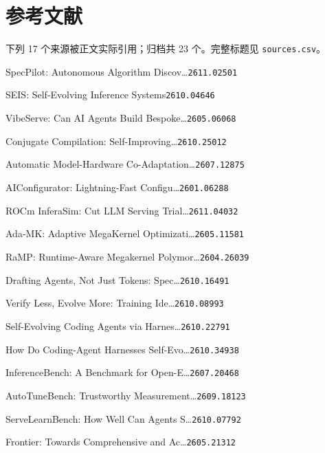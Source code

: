 \section*{参考文献}
\begingroup
\scriptsize
\setlength{\parindent}{0pt}
\setlength{\parskip}{1.4pt}
\begin{refs}
\noindent 下列 17 个来源被正文实际引用；归档共 23 个。完整标题见 \texttt{sources.csv}。\par
[1] SpecPilot: Autonomous Algorithm Discov\ldots{}\hfill{\texttt{2611.02501}}\par
[2] SEIS: Self-Evolving Inference Systems\hfill{\texttt{2610.04646}}\par
[3] VibeServe: Can AI Agents Build Bespoke\ldots{}\hfill{\texttt{2605.06068}}\par
[4] Conjugate Compilation: Self-Improving\ldots{}\hfill{\texttt{2610.25012}}\par
[5] Automatic Model-Hardware Co-Adaptation\ldots{}\hfill{\texttt{2607.12875}}\par
[6] AIConfigurator: Lightning-Fast Configu\ldots{}\hfill{\texttt{2601.06288}}\par
[7] ROCm InferaSim: Cut LLM Serving Trial\ldots{}\hfill{\texttt{2611.04032}}\par
[8] Ada-MK: Adaptive MegaKernel Optimizati\ldots{}\hfill{\texttt{2605.11581}}\par
[9] RaMP: Runtime-Aware Megakernel Polymor\ldots{}\hfill{\texttt{2604.26039}}\par
[10] Drafting Agents, Not Just Tokens: Spec\ldots{}\hfill{\texttt{2610.16491}}\par
[11] Verify Less, Evolve More: Training Ide\ldots{}\hfill{\texttt{2610.08993}}\par
[12] Self-Evolving Coding Agents via Harnes\ldots{}\hfill{\texttt{2610.22791}}\par
[13] How Do Coding-Agent Harnesses Self-Evo\ldots{}\hfill{\texttt{2610.34938}}\par
[14] InferenceBench: A Benchmark for Open-E\ldots{}\hfill{\texttt{2607.20468}}\par
[15] AutoTuneBench: Trustworthy Measurement\ldots{}\hfill{\texttt{2609.18123}}\par
[16] ServeLearnBench: How Well Can Agents S\ldots{}\hfill{\texttt{2610.07792}}\par
[17] Frontier: Towards Comprehensive and Ac\ldots{}\hfill{\texttt{2605.21312}}\par
\end{refs}
\endgroup
